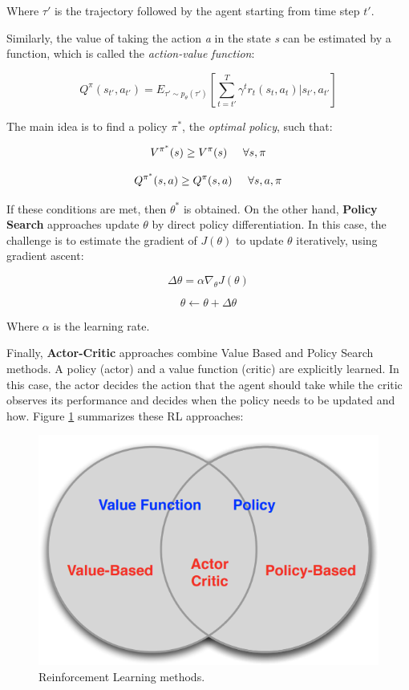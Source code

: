 Where $\tau'$ is the trajectory followed by the agent starting from time step $t'$.

Similarly, the value of taking the action \emph{a} in the state \emph{s} can be estimated by a function, which is called the \emph{action-value function}:

\begin{equation}
    Q^{\pi}(s_{t'}, a_{t'})  = E_{\tau' \sim p_{\theta}(\tau')}\left[\sum_{t=t'}^{T}\gamma^{t}r_{t}(s_{t}, a_{t})|s_{t'},a_{t'}\right]
\end{equation}

The main idea is to find a policy $\pi^{*}$, the \emph{optimal policy}, such that:

\begin{equation}
    V^{\pi^{*}}(s) \geq V^{\pi}(s) \hspace{0.5cm} \forall s, \pi
\end{equation}

\begin{equation}
    Q^{\pi^{*}}(s,a) \geq Q^{\pi}(s,a) \hspace{0.5cm} \forall s,a,\pi
\end{equation}

If these conditions are met, then $\theta^{*}$ is obtained. On the other hand, \textbf{Policy Search} approaches update $\theta$ by direct policy differentiation. In this case, the challenge is to estimate the gradient of $J(\theta)$ to update $\theta$ iteratively, using gradient ascent:

\begin{equation}
    \Delta \theta = \alpha \nabla_{\theta}J(\theta)
\end{equation}

\begin{equation}
    \theta \leftarrow \theta + \Delta \theta
\end{equation}

Where $\alpha$ is the learning rate.

Finally, \textbf{Actor-Critic} approaches combine Value Based and Policy Search methods. A policy (actor) and a value function (critic) are explicitly learned. In this case, the actor decides the action that the agent should take while the critic observes its performance and decides when the policy needs to be updated and how. Figure \ref{fig:rl_summ} summarizes these RL approaches:

\begin{figure}[h]
    \centering
    \includegraphics[width=0.5\linewidth]{imagenes/cap1/rl_summary.png}
    \caption{Reinforcement Learning methods.\protect\footnotemark}
    \label{fig:rl_summ}
\end{figure}

